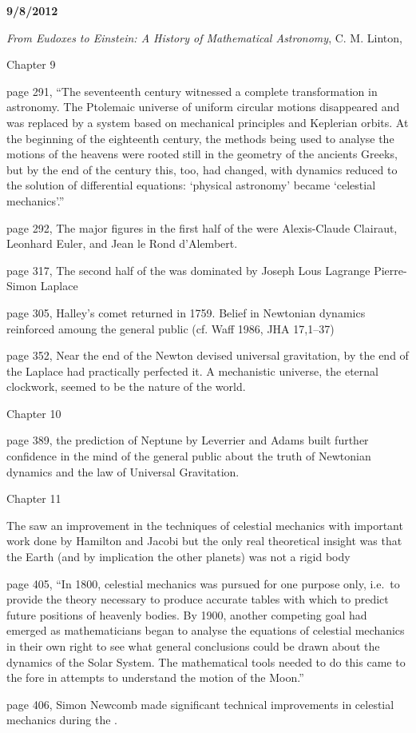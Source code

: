 {\bf 9/8/2012}

\emph{From Eudoxes to Einstein: A History of
Mathematical Astronomy}, C. M. Linton, \cite{Linton2004}

Chapter 9

page 291, ``The seventeenth century witnessed a complete
transformation in astronomy.  The Ptolemaic universe of uniform
circular motions disappeared and was replaced by a system based on
mechanical principles and Keplerian orbits. At the beginning of the
eighteenth century, the methods being used to analyse the motions of
the heavens were rooted still in the geometry of the ancients Greeks,
but by the end of the century this, too, had changed, with dynamics
reduced to the solution of differential equations: `physical
astronomy' became `celestial mechanics'.''

page 292, The major figures in the first half of the  were
Alexis-Claude Clairaut, Leonhard Euler, and Jean le Rond d'Alembert.

page 317, The second half of the  was dominated by Joseph Lous
Lagrange Pierre-Simon Laplace

page 305, Halley's comet returned in 1759. Belief in Newtonian
dynamics reinforced amoung the general public (cf. Waff 1986, JHA
17,1--37)

page 352, Near the end of the  Newton devised universal
gravitation, by the end of the  Laplace had practically
perfected it. A mechanistic universe, the eternal clockwork, seemed to
be the nature of the world.

Chapter 10

page 389, the prediction of Neptune by Leverrier and Adams built
further confidence in the mind of the general public about the truth
of Newtonian dynamics and the law of Universal Gravitation.

Chapter 11

The  saw an improvement in the techniques of celestial
mechanics with important work done by Hamilton and Jacobi but the
only real theoretical insight was that the Earth (and by implication
the other planets) was not a rigid body

page 405, ``In 1800, celestial mechanics was pursued for one purpose
only, i.e.\ to provide the theory necessary to produce accurate tables
with which to predict future positions of heavenly bodies. By 1900,
another competing goal had emerged as mathematicians began to analyse
the equations of celestial mechanics in their own right to see what
general conclusions could be drawn about the dynamics of the Solar
System.  The mathematical tools needed to do this came to the fore in
attempts to understand the motion of the Moon.''

page 406, Simon Newcomb made significant technical improvements
in celestial mechanics during the .


